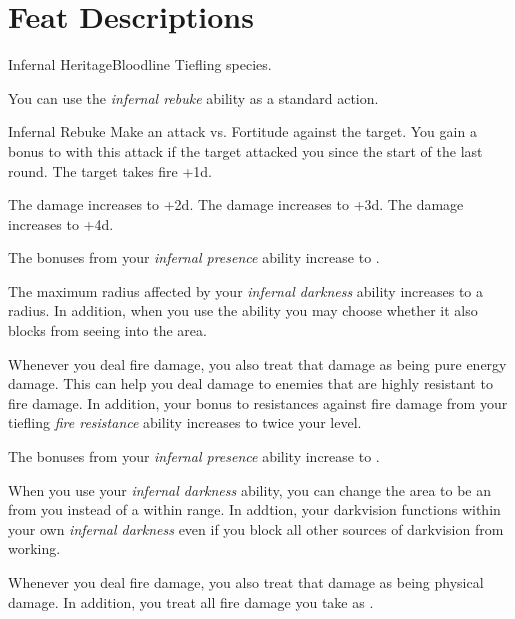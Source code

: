     \section{Feat Descriptions}

    \begin{feat}{Infernal Heritage}{Bloodline}
        \featpre Tiefling species.

         You can use the \textit{infernal rebuke} ability as a standard action.
        \begin{freeability}{Infernal Rebuke}
            Make an attack vs. Fortitude against the target.
            You gain a  bonus to  with this attack if the target attacked you since the start of the last round.
            \hit The target takes fire  +1d.

            \rankline
             The damage increases to  +2d.
             The damage increases to  +3d.
             The damage increases to  +4d.
        \end{freeability}

         The bonuses from your \textit{infernal presence} ability increase to .

         The maximum radius affected by your \textit{infernal darkness} ability increases to a \arealarge radius.
        In addition, when you use the ability you may choose whether it also blocks  from seeing into the area.

         Whenever you deal fire damage, you also treat that damage as being pure energy damage.
        This can help you deal damage to enemies that are highly resistant to fire damage.
        In addition, your bonus to resistances against fire damage from your tiefling \textit{fire resistance} ability increases to twice your level.

         The bonuses from your \textit{infernal presence} ability increase to .

         When you use your \textit{infernal darkness} ability, you can change the area to be an  from you instead of a  within range.
        In addtion, your darkvision functions within your own \textit{infernal darkness} even if you block all other sources of darkvision from working.

         Whenever you deal fire damage, you also treat that damage as being physical damage.
        In addition, you treat all fire damage you take as .
    \end{feat}

